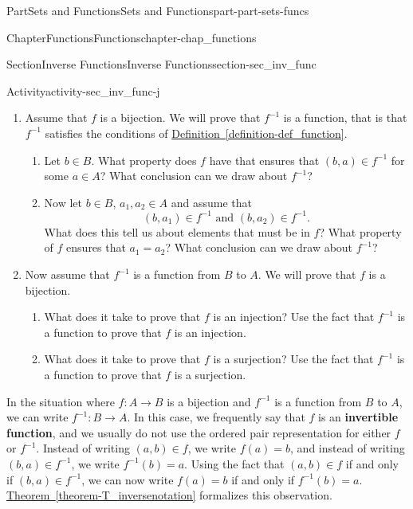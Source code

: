 \documentclass[oneside,10pt,]{book}
\newcommand{\xreffont}{\relax}
\newcommand{\terminology}[1]{\textbf{#1}}
\numberwithin{equation}{chapter}
\begin{document}
\begin{partptx}{Part}{Sets and Functions}{}{Sets and Functions}{}{}{part-part-sets-funcs}
\begin{chapterptx}{Chapter}{Functions}{}{Functions}{}{}{chapter-chap_functions}
\begin{sectionptx}{Section}{Inverse Functions}{}{Inverse Functions}{}{}{section-sec_inv_func}
\begin{activity}{Activity}{}{activity-sec_inv_func-j}
\begin{enumerate}[font=\bfseries,label=(\alph*),ref=\alph*]%
\item{}Assume that  \(f\)  is a bijection. We will prove that \(f^{-1}\) is a function, that is that \(f^{-1}\) satisfies the conditions of \hyperref[definition-def_function]{Definition~{\xreffont\ref{definition-def_function}}}.%
\begin{enumerate}[font=\bfseries,label=(\roman*),ref=\theenumi.\roman*]%
\item{}Let \(b \in B\). What property does \(f\) have that ensures that \((b,a) \in f^{-1}\) for some \(a \in A\)? What conclusion can we draw about \(f^{-1}\)?%
\item{}Now let \(b \in B\), \(a_1 , a_2  \in A\) and assume that%
\begin{equation*}
( {b, a_1 } ) \in f^{ - 1} \text{ and }  ( {b, a_2 } ) \in f^{-1}\text{.}
\end{equation*}
What does this tell us about elements that must be in \(f\)? What property of \(f\) ensures that \(a_1=a_2\)? What conclusion can we draw about \(f^{-1}\)?%
\end{enumerate}%
\item{}Now assume that \(f^{-1}\) is a function from \(B\) to \(A\). We will prove that \(f\) is a bijection.%
\begin{enumerate}[font=\bfseries,label=(\roman*),ref=\theenumi.\roman*]%
\item{}What does it take to prove that \(f\) is an injection? Use the fact that \(f^{-1}\) is a function to prove that \(f\) is an injection.%
\item{}What does it take to prove that \(f\) is a surjection? Use the fact that \(f^{-1}\) is a function to prove that \(f\) is a surjection.%
\end{enumerate}%
\end{enumerate}%
\end{activity}%
In the situation where \(f: A \to B\) is a bijection and \(f^{-1}\) is a function from \(B\) to \(A\), we can write \(f^{-1} : B \to A\). In this case, we frequently say that \(f\) is an \terminology{invertible function}, and we usually do not use the ordered pair representation for either \(f\) or \(f^{-1}\). Instead of writing \(( {a, b} ) \in f\), we write \(f( a ) = b\), and instead of writing \(( {b, a} ) \in f^{-1}\), we write \(f^{-1} ( b ) = a\). Using the fact that \(( {a, b} ) \in f\) if and only if \(( {b, a} ) \in f^{-1}\), we can now write \(f( a ) = b\) if and only if \(f^{-1} ( b ) = a\). \hyperref[theorem-T_inversenotation]{Theorem~{\xreffont\ref{theorem-T_inversenotation}}} formalizes this observation.%

\end{sectionptx}
\end{chapterptx}
\end{partptx}
\end{document}
